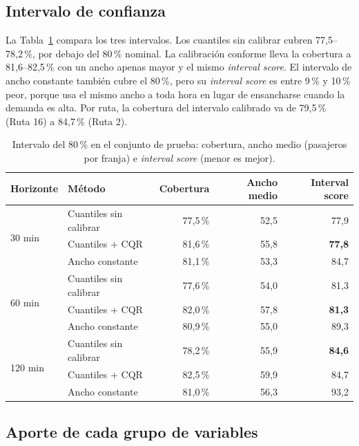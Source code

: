 \documentclass[11pt,a4paper]{article}
\begin{document}
\subsection{Intervalo de confianza}

La Tabla~\ref{tab:intervalos} compara los tres intervalos. Los cuantiles sin calibrar cubren 77,5--78,2\,\%, por debajo del 80\,\% nominal. La calibración conforme lleva la cobertura a 81,6--82,5\,\% con un ancho apenas mayor y el mismo \emph{interval score}. El intervalo de ancho constante también cubre el 80\,\%, pero su \emph{interval score} es entre 9\,\% y 10\,\% peor, porque usa el mismo ancho a toda hora en lugar de ensancharse cuando la demanda es alta. Por ruta, la cobertura del intervalo calibrado va de 79,5\,\% (Ruta 16) a 84,7\,\% (Ruta 2).

\begin{table}[H]
  \centering
  \caption{Intervalo del 80\,\% en el conjunto de prueba: cobertura, ancho medio (pasajeros por franja) e \emph{interval score} (menor es mejor).}
  \label{tab:intervalos}
  \small
  \begin{tabular}{llrrr}
    \toprule
    Horizonte & Método & Cobertura & Ancho medio & Interval score \\
    \midrule
    \multirow{3}{*}{30 min} & Cuantiles sin calibrar & 77,5\,\% & 52,5 & 77,9 \\
     & Cuantiles + CQR & 81,6\,\% & 55,8 & \textbf{77,8} \\
     & Ancho constante & 81,1\,\% & 53,3 & 84,7 \\
    \midrule
    \multirow{3}{*}{60 min} & Cuantiles sin calibrar & 77,6\,\% & 54,0 & 81,3 \\
     & Cuantiles + CQR & 82,0\,\% & 57,8 & \textbf{81,3} \\
     & Ancho constante & 80,9\,\% & 55,0 & 89,3 \\
    \midrule
    \multirow{3}{*}{120 min} & Cuantiles sin calibrar & 78,2\,\% & 55,9 & \textbf{84,6} \\
     & Cuantiles + CQR & 82,5\,\% & 59,9 & 84,7 \\
     & Ancho constante & 81,0\,\% & 56,3 & 93,2 \\
    \bottomrule
  \end{tabular}
\end{table}

\subsection{Aporte de cada grupo de variables}
\end{document}
